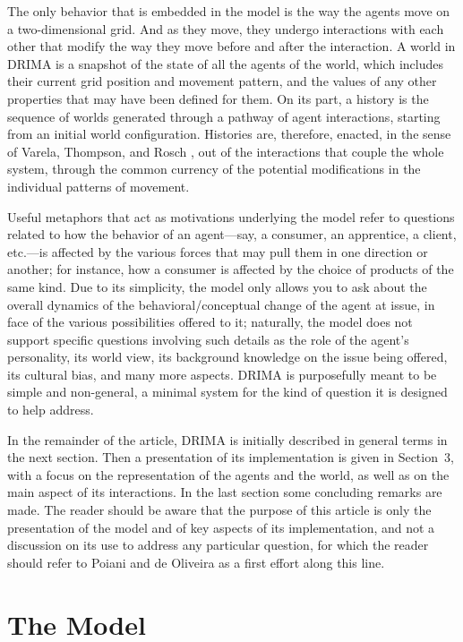 \documentclass[11pt, a4paper]{article}
\begin{document}
The only behavior that is embedded in the model is the way the agents move on a two-dimensional grid. And as they move, they undergo interactions with each other that modify the way they move before and after the interaction. A world in DRIMA is a snapshot of the state of all the agents of the world, which includes their current grid position and movement pattern, and the values of any other properties that may have been defined for them. On its part, a history is the sequence of worlds generated through a pathway of agent interactions, starting from an initial world configuration. Histories are, therefore, enacted, in the sense of Varela, Thompson, and Rosch \cite{ref5}, out of the interactions that couple the whole system, through the common currency of the potential modifications in the individual patterns of movement.

Useful metaphors that act as motivations underlying the model refer to questions related to how the behavior of an agent---say, a consumer, an apprentice, a client, etc.---is affected by the various forces that may pull them in one direction or another; for instance, how a consumer is affected by the choice of products of the same kind. Due to its simplicity, the model only allows you to ask about the overall dynamics of the behavioral/conceptual change of the agent at issue, in face of the various possibilities offered to it; naturally, the model does not support specific questions involving such details as the role of the agent's personality, its world view, its background knowledge on the issue being offered, its cultural bias, and many more aspects. DRIMA is purposefully meant to be simple and non-general, a minimal system for the kind of question it is designed to help address.

In the remainder of the article, DRIMA is initially described in general terms in the next section. Then a presentation of its implementation is given in Section~3, with a focus on the representation of the agents and the world, as well as on the main aspect of its interactions. In the last section some concluding remarks are made. The reader should be aware that the purpose of this article is only the presentation of the model and of key aspects of its implementation, and not a discussion on its use to address any particular question, for which the reader should refer to Poiani and de Oliveira \cite{ref6} as a first effort along this line.

\section{The Model}
\end{document}
